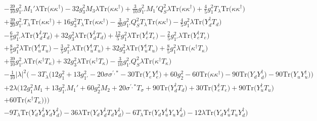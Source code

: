 {\begin{align}
 &-\frac{39}{10} g_{1'}^{2} M_1' \lambda \mbox{Tr}\Big({\kappa  \kappa^{\dagger}}\Big) -32 g_{3}^{2} M_3 \lambda \mbox{Tr}\Big({\kappa  \kappa^{\dagger}}\Big) +\frac{3}{10} g_{1'}^{2} M_1' Q_{S}^{2} \lambda \mbox{Tr}\Big({\kappa  \kappa^{\dagger}}\Big) +\frac{4}{5} g_{1}^{2} T_{\lambda} \mbox{Tr}\Big({\kappa  \kappa^{\dagger}}\Big) \nonumber \\ 
 &+\frac{39}{20} g_{1'}^{2} T_{\lambda} \mbox{Tr}\Big({\kappa  \kappa^{\dagger}}\Big) +16 g_{3}^{2} T_{\lambda} \mbox{Tr}\Big({\kappa  \kappa^{\dagger}}\Big) -\frac{3}{20} g_{1'}^{2} Q_{S}^{2} T_{\lambda} \mbox{Tr}\Big({\kappa  \kappa^{\dagger}}\Big) -\frac{4}{5} g_{1}^{2} \lambda \mbox{Tr}\Big({Y_{d}^{\dagger}  T_d}\Big) \nonumber \\ 
 &-\frac{6}{5} g_{1'}^{2} \lambda \mbox{Tr}\Big({Y_{d}^{\dagger}  T_d}\Big) +32 g_{3}^{2} \lambda \mbox{Tr}\Big({Y_{d}^{\dagger}  T_d}\Big) +\frac{12}{5} g_{1}^{2} \lambda \mbox{Tr}\Big({Y_{e}^{\dagger}  T_e}\Big) -\frac{2}{5} g_{1'}^{2} \lambda \mbox{Tr}\Big({Y_{e}^{\dagger}  T_e}\Big) \nonumber \\ 
 &+\frac{8}{5} g_{1}^{2} \lambda \mbox{Tr}\Big({Y_{u}^{\dagger}  T_u}\Big) -\frac{3}{5} g_{1'}^{2} \lambda \mbox{Tr}\Big({Y_{u}^{\dagger}  T_u}\Big) +32 g_{3}^{2} \lambda \mbox{Tr}\Big({Y_{u}^{\dagger}  T_u}\Big) +\frac{8}{5} g_{1}^{2} \lambda \mbox{Tr}\Big({\kappa^{\dagger}  T_{\kappa}}\Big) \nonumber \\ 
 &+\frac{39}{10} g_{1'}^{2} \lambda \mbox{Tr}\Big({\kappa^{\dagger}  T_{\kappa}}\Big) +32 g_{3}^{2} \lambda \mbox{Tr}\Big({\kappa^{\dagger}  T_{\kappa}}\Big) -\frac{3}{10} g_{1'}^{2} Q_{S}^{2} \lambda \mbox{Tr}\Big({\kappa^{\dagger}  T_{\kappa}}\Big) \nonumber \\ 
 &-\frac{1}{10} |\lambda|^2 \Big(-3 T_{\lambda} \Big(12 g_{1}^{2}  + 13 g_{1'}^{2}  -20 \sigma \sigma^{\prime,*}  -30 \mbox{Tr}\Big({Y_e  Y_{e}^{\dagger}}\Big)  + 60 g_{2}^{2}  -60 \mbox{Tr}\Big({\kappa  \kappa^{\dagger}}\Big)  -90 \mbox{Tr}\Big({Y_d  Y_{d}^{\dagger}}\Big)  -90 \mbox{Tr}\Big({Y_u  Y_{u}^{\dagger}}\Big) \Big)\nonumber \\ 
 &+2 \lambda \Big(12 g_{1}^{2} M_1 +13 g_{1'}^{2} M_1' +60 g_{2}^{2} M_2 +20 \sigma^{\prime,*} T_{\sigma} +90 \mbox{Tr}\Big({Y_{d}^{\dagger}  T_d}\Big) +30 \mbox{Tr}\Big({Y_{e}^{\dagger}  T_e}\Big) +90 \mbox{Tr}\Big({Y_{u}^{\dagger}  T_u}\Big) \nonumber \\ 
 &+60 \mbox{Tr}\Big({\kappa^{\dagger}  T_{\kappa}}\Big) \Big)\Big)\nonumber \\ 
 &-9 T_{\lambda} \mbox{Tr}\Big({Y_d  Y_{d}^{\dagger}  Y_d  Y_{d}^{\dagger}}\Big) -36 \lambda \mbox{Tr}\Big({Y_d  Y_{d}^{\dagger}  T_d  Y_{d}^{\dagger}}\Big) -6 T_{\lambda} \mbox{Tr}\Big({Y_d  Y_{u}^{\dagger}  Y_u  Y_{d}^{\dagger}}\Big) -12 \lambda \mbox{Tr}\Big({Y_d  Y_{u}^{\dagger}  T_u  Y_{d}^{\dagger}}\Big) \nonumber \\ 

\end{align}}
